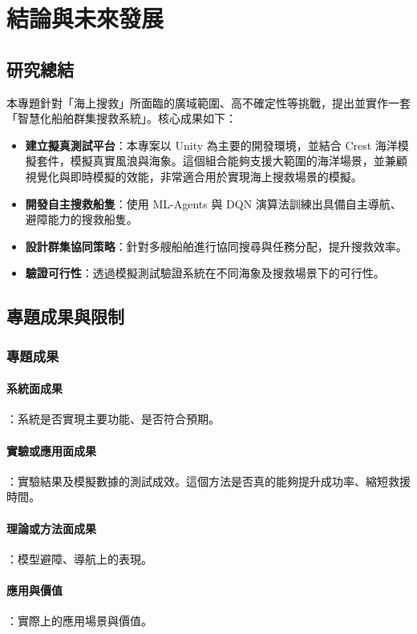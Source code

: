 \documentclass[12pt,a4paper]{article}
\begin{document}
\section{結論與未來發展}

\subsection{研究總結}
本專題針對「海上搜救」所面臨的廣域範圍、高不確定性等挑戰，提出並實作一套「智慧化船舶群集搜救系統」。核心成果如下：
\begin{itemize}
    \item \textbf{建立擬真測試平台}：本專案以 Unity 為主要的開發環境，並結合 Crest 海洋模擬套件，模擬真實風浪與海象。這個組合能夠支援大範圍的海洋場景，並兼顧視覺化與即時模擬的效能，非常適合用於實現海上搜救場景的模擬。
    \item \textbf{開發自主搜救船隻}：使用 ML-Agents 與 DQN 演算法訓練出具備自主導航、避障能力的搜救船隻。
    \item \textbf{設計群集協同策略}：針對多艘船舶進行協同搜尋與任務分配，提升搜救效率。
    \item \textbf{驗證可行性}：透過模擬測試驗證系統在不同海象及搜救場景下的可行性。
\end{itemize}

\subsection{專題成果與限制}
\subsubsection{專題成果}
\paragraph{系統面成果}：系統是否實現主要功能、是否符合預期。

\paragraph{實驗或應用面成果}：實驗結果及模擬數據的測試成效。這個方法是否真的能夠提升成功率、縮短救援時間。

\paragraph{理論或方法面成果}：模型避障、導航上的表現。

\paragraph{應用與價值}：實際上的應用場景與價值。
\end{document}
